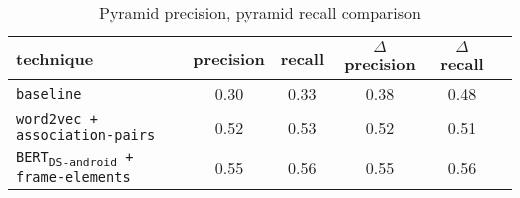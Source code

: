 \begin{table}[H]
\centering    
\begin{small}
\begin{threeparttable}
\begin{tabular}{lccccc}


\textbf{technique} & 
\textbf{precision} & \textbf{recall} & 
$\Delta$ \textbf{precision} & $\Delta$ \textbf{recall} \\


\hline


\texttt{baseline} &
0.30 & 0.33 &  
0.38 & 0.48 
\\

\texttt{word2vec + association-pairs} &
0.52 & 0.53 &  
0.52 & 0.51
\\


\texttt{BERT\textsubscript{DS-android} + frame-elements} &
0.55 & 0.56 & 
0.55 & 0.56 
\\

\hline

\end{tabular}
\end{threeparttable}
\end{small}
\caption{Pyramid precision, pyramid recall comparison}
\label{tbl:approach-results-overall}
\end{table}

